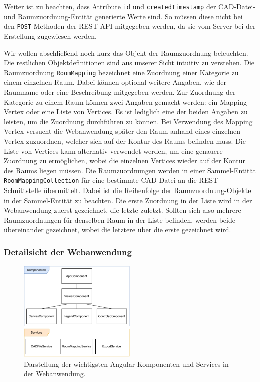 Weiter ist zu beachten, dass Attribute \texttt{id} und \texttt{createdTimestamp} der CAD-Datei- und Raumzuordnung-Entität generierte Werte sind.
So müssen diese nicht bei den \texttt{POST}-Methoden der REST-API mitgegeben werden, da sie vom Server bei der Erstellung zugewiesen werden.

Wir wollen abschließend noch kurz das Objekt der Raumzuordnung beleuchten.
Die restlichen Objektdefinitionen sind aus unserer Sicht intuitiv zu verstehen.
Die Raumzuordnung \texttt{RoomMapping} bezeichnet eine Zuordnung einer Kategorie zu einem einzelnen Raum.
Dabei können optional weitere Angaben, wie der Raumname oder eine Beschreibung mitgegeben werden.
Zur Zuordnung der Kategorie zu einem Raum können zwei Angaben gemacht werden: ein Mapping Vertex oder eine Liste von Vertices.
Es ist lediglich eine der beiden Angaben zu leisten, um die Zuordnung durchführen zu können.
Bei Verwendung des Mapping Vertex versucht die Webanwendung später den Raum anhand eines einzelnen Vertex zuzuordnen, welcher sich auf der Kontur des Raums befinden muss.
Die Liste von Vertices kann alternativ verwendet werden, um eine genauere Zuordnung zu ermöglichen, wobei die einzelnen Vertices wieder auf der Kontur des Raums liegen müssen.
Die Raumzuordnungen werden in einer Sammel-Entität \texttt{RoomMappingCollection} für eine bestimmte CAD-Datei an die REST-Schnittstelle übermittelt.
Dabei ist die Reihenfolge der Raumzuordnung-Objekte in der Sammel-Entität zu beachten.
Die erste Zuordnung in der Liste wird in der Webanwendung zuerst gezeichnet, die letzte zuletzt.
Sollten sich also mehrere Raumzuordnungen für denselben Raum in der Liste befinden, werden beide übereinander gezeichnet, wobei die letztere über die erste gezeichnet wird.

\subsubsection{Detailsicht der Webanwendung}
\label{subsubsec:detail-webapp}

\begin{figure}
    \includegraphics[width=0.5\textwidth]{res/frontend.pdf}
    \caption{Darstellung der wichtigsten Angular Komponenten und Services in der Webanwendung.}
    \label{fig:angular-components}
\end{figure}

